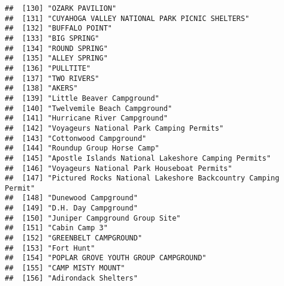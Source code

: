 \documentclass[
]{article}
\begin{document}
\begin{verbatim}
##  [130] "OZARK PAVILION"                                                                      
##  [131] "CUYAHOGA VALLEY NATIONAL PARK PICNIC SHELTERS"                                       
##  [132] "BUFFALO POINT"                                                                       
##  [133] "BIG SPRING"                                                                          
##  [134] "ROUND SPRING"                                                                        
##  [135] "ALLEY SPRING"                                                                        
##  [136] "PULLTITE"                                                                            
##  [137] "TWO RIVERS"                                                                          
##  [138] "AKERS"                                                                               
##  [139] "Little Beaver Campground"                                                            
##  [140] "Twelvemile Beach Campground"                                                         
##  [141] "Hurricane River Campground"                                                          
##  [142] "Voyageurs National Park Camping Permits"                                             
##  [143] "Cottonwood Campground"                                                               
##  [144] "Roundup Group Horse Camp"                                                            
##  [145] "Apostle Islands National Lakeshore Camping Permits"                                  
##  [146] "Voyageurs National Park Houseboat Permits"                                           
##  [147] "Pictured Rocks National Lakeshore Backcountry Camping Permit"                        
##  [148] "Dunewood Campground"                                                                 
##  [149] "D.H. Day Campground"                                                                 
##  [150] "Juniper Campground Group Site"                                                       
##  [151] "Cabin Camp 3"                                                                        
##  [152] "GREENBELT CAMPGROUND"                                                                
##  [153] "Fort Hunt"                                                                           
##  [154] "POPLAR GROVE YOUTH GROUP CAMPGROUND"                                                 
##  [155] "CAMP MISTY MOUNT"                                                                    
##  [156] "Adirondack Shelters"                                                                 

\end{verbatim}
\end{document}
